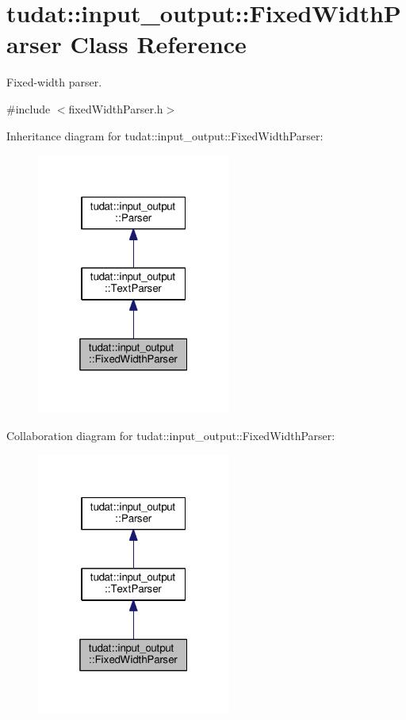 \hypertarget{classtudat_1_1input__output_1_1FixedWidthParser}{}\section{tudat\+:\+:input\+\_\+output\+:\+:Fixed\+Width\+Parser Class Reference}
\label{classtudat_1_1input__output_1_1FixedWidthParser}


Fixed-\/width parser.  




{\ttfamily \#include $<$fixed\+Width\+Parser.\+h$>$}



Inheritance diagram for tudat\+:\+:input\+\_\+output\+:\+:Fixed\+Width\+Parser\+:
\nopagebreak
\begin{figure}[H]
\begin{center}
\leavevmode
\includegraphics[width=181pt]{classtudat_1_1input__output_1_1FixedWidthParser__inherit__graph}
\end{center}
\end{figure}


Collaboration diagram for tudat\+:\+:input\+\_\+output\+:\+:Fixed\+Width\+Parser\+:
\nopagebreak
\begin{figure}[H]
\begin{center}
\leavevmode
\includegraphics[width=181pt]{classtudat_1_1input__output_1_1FixedWidthParser__coll__graph}
\end{center}
\end{figure}
